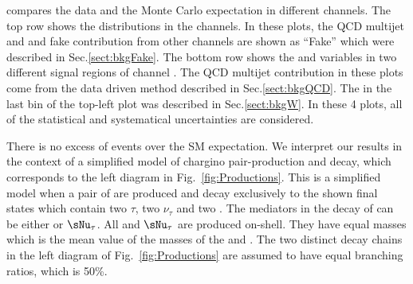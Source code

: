 compares the data and the Monte Carlo expectation in different channels. The top row 
shows the \mttwo distributions in the \leptonTau channels. 
In these plots, the QCD multijet and \wjets and fake contribution from other channels are shown 
as ``Fake'' which were described in Sec.\ref{sect:bkgFake}.
The bottom row shows the \mttwo and \SumMT variables in two different signal regions of \tauTau channel . 
The QCD multijet contribution in these plots come from the data driven method described in 
Sec.\ref{sect:bkgQCD}. The \wjets in the last bin of the top-left plot was described in Sec.\ref{sect:bkgW}. 
In these 4 plots, all of the statistical and systematical uncertainties are considered.

There is no excess of events over the SM expectation.  We interpret our results in the context
of a simplified model of chargino pair-production and decay, which corresponds to the left
diagram in Fig.~\ref{fig:Productions}. This is a simplified model when a pair of \chione 
are produced and decay exclusively to the shown final states which contain two $\tau$, two $\nu_{\tau}$ and two \PSGczDo.
The mediators in the decay of \chione can be either \sTau or $\sNu_{\tau}$. All  \sTau and $\sNu_{\tau}$ 
are produced  on-shell. They have equal masses which is the mean value of the masses of the \chione   and \PSGczDo.
The two distinct decay chains in the left diagram of Fig.~\ref{fig:Productions} are assumed to have equal branching ratios, which is 50\%.

